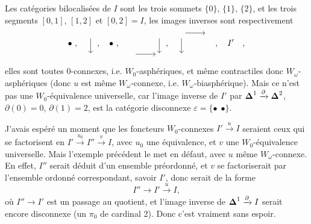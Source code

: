Les catégories bilocalisées de $I$ sont les trois sommets $\{0\}$, $\{1\}$, $\{2\}$, et les trois segments $[0,1]$, $[1,2]$ et $[0,2] = I$, les images inverses sont respectivement
\[
\bullet\ ,\quad
\begin{tikzcd}[row sep=normal] {} \arrow[d] \\ {} \end{tikzcd}\ ,\quad
\bullet\ ,\quad
\begin{tikzcd}[row sep=normal] & {} \arrow[d] \\ {} \arrow[r] & {} \end{tikzcd}\ ,\quad
\begin{tikzcd}[row sep=normal] {} \arrow[r] \arrow[d] & {} \\ {} & \end{tikzcd}\ ,\quad
I'\quad ,
\]
elles sont toutes 0-connexes, i.e. $W_0$-asphériques, et même contractiles donc $W_\omega$-asphériques (donc $u$ est même $W_\omega$-connexe, i.e. $W_\omega$-biasphérique). Mais ce n'est pas une $W_0$-équivalence universelle, car l'image inverse de $I'$ par $\boldsymbol{\Delta}^1 \xrightarrow{\partial} \boldsymbol{\Delta}^2$, $\partial(0) = 0$, $\partial(1) = 2$, est la catégorie disconnexe $\varepsilon = \{\bullet\ \ \bullet\}$.

J'avais espéré un moment que les foncteurs $W_0$-connexes $I' \xrightarrow{u} I$ seraient ceux qui se factorisent en $I' \xrightarrow{u_0} I'' \xrightarrow{v} I$, avec $u_0$ une équivalence, et $v$ une $W_0$-équivalence universelle. Mais l'exemple précédent le met en défaut, avec $u$ même $W_\omega$-connexe. En effet, $I''$ serait déduit d'un ensemble préordonné, et $v$ se factoriserait par l'ensemble ordonné correspondant, savoir $I'$, donc serait de la forme
\[
I'' \longrightarrow I' \xrightarrow{u} I,
\]
où $I'' \longrightarrow I'$ est un passage au quotient, et l'image inverse de $\boldsymbol{\Delta}^1 \xrightarrow{\partial} I$ serait encore disconnexe (un $\pi_0$ de cardinal 2). Donc c'est vraiment sans espoir.

